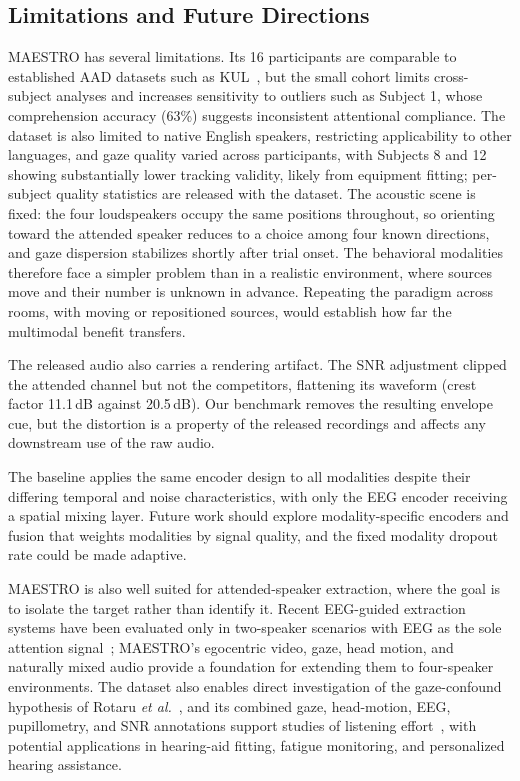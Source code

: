 \documentclass[journal]{IEEEtran}
\begin{document}
\subsection{Limitations and Future Directions}
MAESTRO has several limitations. Its 16 participants are comparable to established AAD datasets such as KUL~\cite{biesmans2016}, but the small cohort limits cross-subject analyses and increases sensitivity to outliers such as Subject 1, whose comprehension accuracy (63\%) suggests inconsistent attentional compliance. The dataset is also limited to native English speakers, restricting applicability to other languages, and gaze quality varied across participants, with Subjects 8 and 12 showing substantially lower tracking validity, likely from equipment fitting; per-subject quality statistics are released with the dataset. The acoustic scene is fixed: the four loudspeakers occupy the same positions throughout, so orienting toward the attended speaker reduces to a choice among four known directions, and gaze dispersion stabilizes shortly after trial onset. The behavioral modalities therefore face a simpler problem than in a realistic environment, where sources move and their number is unknown in advance. Repeating the paradigm across rooms, with moving or repositioned sources, would establish how far the multimodal benefit transfers.

The released audio also carries a rendering artifact. The SNR adjustment clipped the attended channel but not the competitors, flattening its waveform (crest factor 11.1\,dB against 20.5\,dB). Our benchmark removes the resulting envelope cue, but the distortion is a property of the released recordings and affects any downstream use of the raw audio.

The baseline applies the same encoder design to all modalities despite their differing temporal and noise characteristics, with only the EEG encoder receiving a spatial mixing layer. Future work should explore modality-specific encoders and fusion that weights modalities by signal quality, and the fixed modality dropout rate could be made adaptive.

MAESTRO is also well suited for attended-speaker extraction, where the goal is to isolate the target rather than identify it. Recent EEG-guided extraction systems have been evaluated only in two-speaker scenarios with EEG as the sole attention signal~\cite{pan10683957, pan2024neuroheed+}; MAESTRO's egocentric video, gaze, head motion, and naturally mixed audio provide a foundation for extending them to four-speaker environments. The dataset also enables direct investigation of the gaze-confound hypothesis of Rotaru \textit{et al.}~\cite{rotaru2024}, and its combined gaze, head-motion, EEG, pupillometry, and SNR annotations support studies of listening effort~\cite{dimitrijevic2019neural, seifi2020exploratory}, with potential applications in hearing-aid fitting, fatigue monitoring, and personalized hearing assistance.
\end{document}
